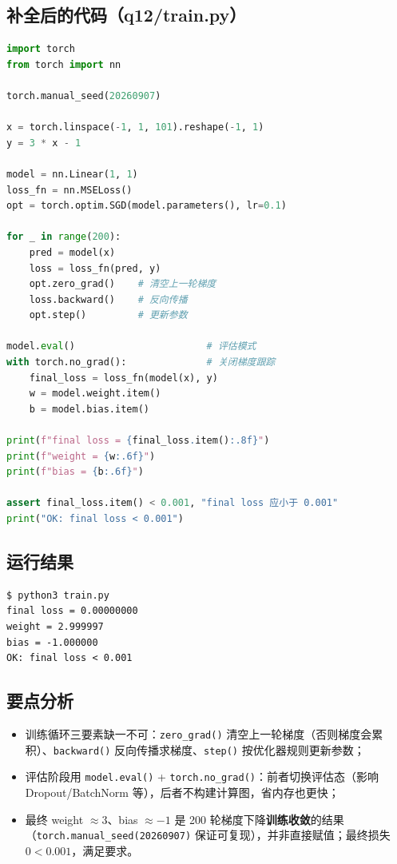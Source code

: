 \documentclass[UTF8,fontset=ubuntu]{ctexart}
\begin{document}
\subsection{补全后的代码（q12/train.py）}
\begin{lstlisting}[language=Python]
import torch
from torch import nn

torch.manual_seed(20260907)

x = torch.linspace(-1, 1, 101).reshape(-1, 1)
y = 3 * x - 1

model = nn.Linear(1, 1)
loss_fn = nn.MSELoss()
opt = torch.optim.SGD(model.parameters(), lr=0.1)

for _ in range(200):
    pred = model(x)
    loss = loss_fn(pred, y)
    opt.zero_grad()    # 清空上一轮梯度
    loss.backward()    # 反向传播
    opt.step()         # 更新参数

model.eval()                       # 评估模式
with torch.no_grad():              # 关闭梯度跟踪
    final_loss = loss_fn(model(x), y)
    w = model.weight.item()
    b = model.bias.item()

print(f"final loss = {final_loss.item():.8f}")
print(f"weight = {w:.6f}")
print(f"bias = {b:.6f}")

assert final_loss.item() < 0.001, "final loss 应小于 0.001"
print("OK: final loss < 0.001")
\end{lstlisting}

\subsection{运行结果}
\begin{lstlisting}
$ python3 train.py
final loss = 0.00000000
weight = 2.999997
bias = -1.000000
OK: final loss < 0.001
\end{lstlisting}

\subsection{要点分析}
\begin{itemize}
\item 训练循环三要素缺一不可：\lstinline|zero_grad()| 清空上一轮梯度（否则梯度会累积）、\lstinline|backward()| 反向传播求梯度、\lstinline|step()| 按优化器规则更新参数；
\item 评估阶段用 \lstinline|model.eval()| + \lstinline|torch.no_grad()|：前者切换评估态（影响 Dropout/BatchNorm 等），后者不构建计算图，省内存也更快；
\item 最终 weight $\approx 3$、bias $\approx -1$ 是 200 轮梯度下降\textbf{训练收敛}的结果（\lstinline|torch.manual_seed(20260907)| 保证可复现），并非直接赋值；最终损失 $0 < 0.001$，满足要求。
\end{itemize}
\end{document}
